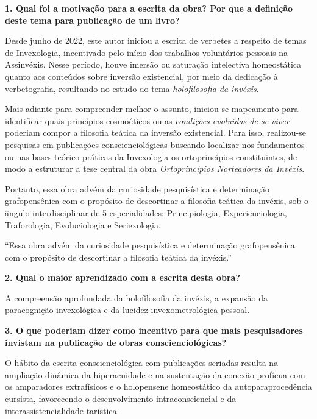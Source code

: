 \documentclass{gescons}
\begin{document}
    \begin{multicols}{2}



\textbf{1. Qual foi a motivação para a escrita da obra? Por que a definição deste tema para publicação de um livro?}

Desde junho de 2022, este autor iniciou a escrita de verbetes a respeito de temas de Invexologia, incentivado pelo início dos trabalhos voluntários pessoais na Assinvéxis. Nesse período, houve imersão ou saturação intelectiva homeostática quanto aos conteúdos sobre inversão existencial, por meio da dedicação à verbetografia, resultando no estudo do tema \textit{holofilosofia da invéxis}.

Mais adiante para compreender melhor o assunto, iniciou-se mapeamento para identificar quais princípios cosmoéticos ou as \textit{condições evoluídas de se viver} poderiam compor a filosofia teática da inversão existencial. Para isso, realizou-se pesquisas em publicações conscienciológicas buscando localizar nos fundamentos ou nas bases teórico-práticas da Invexologia os ortoprincípios constituintes, de modo a estruturar a tese central da obra \textit{Ortoprincípios Norteadores da Invéxis}.

Portanto, essa obra advém da curiosidade pesquisística e determinação grafopensênica com o propósito de descortinar a filosofia teática da invéxis, sob 
o ângulo interdisciplinar de 5 especialidades: Principiologia, Experienciologia, Traforologia, Evoluciologia e Seriexologia.

\begin{pullquote}
``Essa obra advém da curiosidade pesquisística e determinação grafopensênica com o propósito de descortinar a filosofia teática da invéxis.''    
\end{pullquote}




\textbf{2. Qual o maior aprendizado com a escrita desta obra?}

A compreensão aprofundada da holofilosofia da invéxis, a expansão da paracognição invexológica e da lucidez invexometrológica pessoal.

\textbf{3. O que poderiam dizer como incentivo para que mais pesquisadores invistam na publicação de obras conscienciológicas?}

O hábito da escrita conscienciológica com publicações seriadas resulta na ampliação dinâmica da hiperacuidade e na sustentação da conexão profícua com os amparadores extrafísicos e o holopensene homeostático da autoparaprocedência cursista, favorecendo o desenvolvimento intraconsciencial e da interassistencialidade tarística.


    
    
    \end{multicols}
\end{document}

